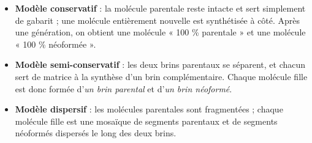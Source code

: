 \documentclass[11pt]{article}
\begin{document}
\begin{itemize}
\item \textbf{Modèle conservatif} : la molécule parentale reste intacte et sert simplement de gabarit ; une molécule entièrement nouvelle est synthétisée à côté. Après une génération, on obtient une molécule « 100 \% parentale » et une molécule « 100 \% néoformée ».
\item \textbf{Modèle semi-conservatif} : les deux brins parentaux se séparent, et chacun sert de matrice à la synthèse d'un brin complémentaire. Chaque molécule fille est donc formée d'\emph{un brin parental} et d'\emph{un brin néoformé}.
\item \textbf{Modèle dispersif} : les molécules parentales sont fragmentées ; chaque molécule fille est une mosaïque de segments parentaux et de segments néoformés dispersés le long des deux brins.
\end{itemize}
\end{document}
